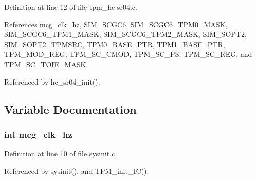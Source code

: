 Definition at line 12 of file tpm\+\_\+hc-\/sr04.\+c.



References mcg\+\_\+clk\+\_\+hz, S\+I\+M\+\_\+\+S\+C\+G\+C6, S\+I\+M\+\_\+\+S\+C\+G\+C6\+\_\+\+T\+P\+M0\+\_\+\+M\+A\+SK, S\+I\+M\+\_\+\+S\+C\+G\+C6\+\_\+\+T\+P\+M1\+\_\+\+M\+A\+SK, S\+I\+M\+\_\+\+S\+C\+G\+C6\+\_\+\+T\+P\+M2\+\_\+\+M\+A\+SK, S\+I\+M\+\_\+\+S\+O\+P\+T2, S\+I\+M\+\_\+\+S\+O\+P\+T2\+\_\+\+T\+P\+M\+S\+RC, T\+P\+M0\+\_\+\+B\+A\+S\+E\+\_\+\+P\+TR, T\+P\+M1\+\_\+\+B\+A\+S\+E\+\_\+\+P\+TR, T\+P\+M\+\_\+\+M\+O\+D\+\_\+\+R\+EG, T\+P\+M\+\_\+\+S\+C\+\_\+\+C\+M\+OD, T\+P\+M\+\_\+\+S\+C\+\_\+\+PS, T\+P\+M\+\_\+\+S\+C\+\_\+\+R\+EG, and T\+P\+M\+\_\+\+S\+C\+\_\+\+T\+O\+I\+E\+\_\+\+M\+A\+SK.



Referenced by hc\+\_\+sr04\+\_\+init().



\subsection{Variable Documentation}
\subsubsection[{\texorpdfstring{mcg\+\_\+clk\+\_\+hz}{mcg_clk_hz}}]{\setlength{\rightskip}{0pt plus 5cm}int mcg\+\_\+clk\+\_\+hz}\hypertarget{tpm__hc-sr04_8c_a5383539a3a607e05906f71be0fd4f4af}{}\label{tpm__hc-sr04_8c_a5383539a3a607e05906f71be0fd4f4af}


Definition at line 10 of file sysinit.\+c.



Referenced by sysinit(), and T\+P\+M\+\_\+init\+\_\+\+I\+C().

